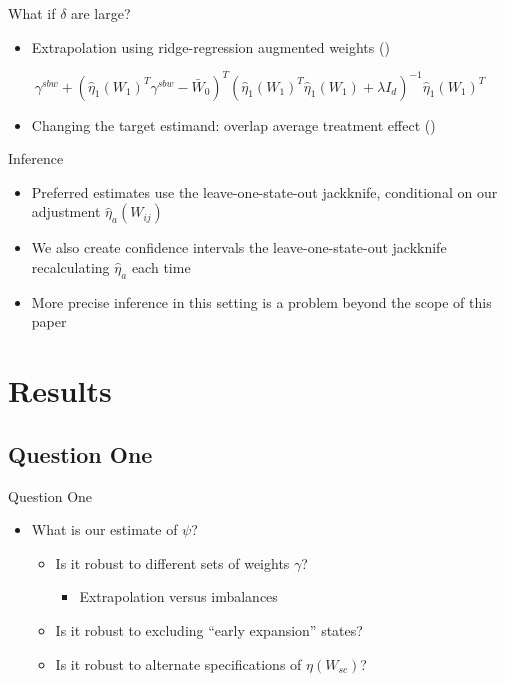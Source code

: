 \documentclass[hyperref={pdfpagelabels=false}]{beamer}
\begin{document}
\begin{frame}{What if $\delta$ are large?}
    \begin{itemize}
        \item Extrapolation using ridge-regression augmented weights (\cite{ben2018augmented}) \bigskip
    \end{itemize}
    
    $$
    \gamma^{sbw} + (\hat{\eta}_1(W_1)^T\gamma^{sbw} - \bar{W}_0)^T(\hat{\eta}_1(W_1)^T\hat{\eta}_1(W_1) + \lambda I_d)^{-1}\hat{\eta}_1(W_1)^T
    $$
    \bigskip
    \begin{itemize}
        \item Changing the target estimand: overlap average treatment effect (\cite{li2018balancing})
    \end{itemize}
\end{frame}

\begin{frame}{Inference}
    \begin{itemize}
        \item Preferred estimates use the leave-one-state-out jackknife, conditional on our adjustment $\hat{\eta}_a(W_{ij})$ \bigskip
        \item We also create confidence intervals the leave-one-state-out jackknife recalculating $\hat{\eta}_a$ each time \bigskip
        \item More precise inference in this setting is a problem beyond the scope of this paper
    \end{itemize}
\end{frame}

\section{Results}

\subsection{Question One}

\begin{frame}{Question One}
    \begin{itemize}
        \item What is our estimate of $\psi$? \bigskip
        \begin{itemize}
            \item Is it robust to different sets of weights $\gamma$? \bigskip
            \begin{itemize}
                \item Extrapolation versus imbalances \bigskip
            \end{itemize}
            \item Is it robust to excluding ``early expansion'' states? \bigskip
            \item Is it robust to alternate specifications of $\eta(W_{sc})$? \bigskip
        \end{itemize}
    \end{itemize}
\end{frame}
\end{document}
